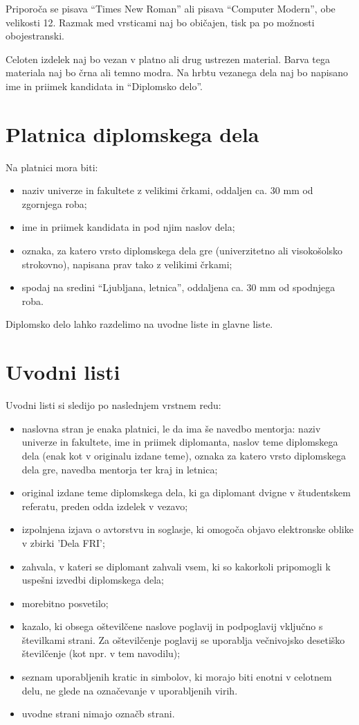 \documentclass[12pt,a4paper]{book}
\begin{document}
Priporoča se pisava ``Times New Roman'' ali pisava ``Computer Modern'', obe velikosti 12. 
Razmak med vrsticami naj bo običajen, tisk pa po možnosti obojestranski.

Celoten izdelek naj bo vezan v platno ali drug ustrezen material. 
Barva tega materiala naj bo črna ali temno modra. 
Na hrbtu vezanega dela naj bo napisano ime in priimek kandidata in ``Diplomsko delo''.

\section{Platnica diplomskega dela}
Na platnici mora biti: 
\begin{itemize}
\item	naziv univerze in fakultete z velikimi črkami, oddaljen ca. 30 mm od zgornjega roba; 
\item	ime in priimek kandidata in pod njim naslov dela;
\item	oznaka, za katero vrsto diplomskega dela gre (univerzitetno ali visoko\-šol\-sko strokovno), napisana prav tako z velikimi črkami;
\item	spodaj na sredini ``Ljubljana, letnica'', oddaljena ca. 30 mm od spodnjega roba. 
\end{itemize}
Diplomsko delo lahko razdelimo na uvodne liste in glavne liste.

\section{Uvodni listi}
Uvodni listi si sledijo po naslednjem vrstnem redu: 
\begin{itemize}
\item	
naslovna stran je enaka platnici, le da ima še navedbo mentorja:
naziv univerze in fakultete, ime in priimek diplomanta, 
naslov teme diplom\-ske\-ga dela (enak kot v originalu izdane teme), oznaka za katero vrsto diplomskega dela gre, navedba mentorja ter kraj in
letnica; 
\item	original izdane teme diplomskega dela, ki ga diplomant dvigne v študent\-skem referatu, preden odda izdelek v vezavo;
\item izpolnjena izjava o avtorstvu in soglasje, ki omogoča objavo elektronske oblike v zbirki 'Dela FRI'; 
\item	zahvala, v kateri se diplomant zahvali vsem, ki so kakorkoli pripomogli k uspešni izvedbi diplomskega dela; 
\item	morebitno posvetilo;
\item	kazalo, ki obsega oštevilčene naslove poglavij in podpoglavij vključno s številkami strani. 
Za oštevilčenje poglavij se uporablja večnivojsko desetiško številčenje (kot npr. v tem navodilu);
\item	seznam uporabljenih kratic in simbolov, ki morajo biti enotni v celotnem delu, ne glede na označevanje v uporabljenih virih. 
\item uvodne strani nimajo označb strani.
\end{itemize}
\end{document}
